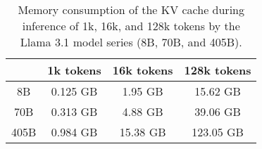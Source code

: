 \begin{table}[ht]
\begin{tabular}{cccc}
\toprule
{} & 
{1k tokens} & 
{16k tokens} & 
{128k tokens} \\ 
\midrule
{8B} & 
{0.125 GB} & 
{1.95 GB} & 
{15.62 GB} \\ 
\midrule
{70B} &
{0.313 GB} & 
{4.88 GB} & 
{39.06 GB} \\ 
\midrule
{405B} & 
{0.984 GB} & 
{15.38 GB} & 
{123.05 GB} \\ 
\bottomrule
\end{tabular}
\centering
\caption{Memory consumption of the KV cache during inference of 1k, 16k, and 128k tokens by the Llama 3.1 model series (8B, 70B, and 405B).}
\label{tbl-challenge-KV-memory}
\end{table}